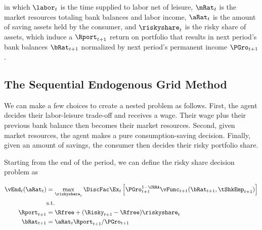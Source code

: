 \documentclass[\econtexRoot/EGMN]{subfiles}
\begin{document}
in which $\labor_{t}$ is the time supplied to labor net of leisure, $\mRat_{t}$ is the market resources totaling bank balances and labor income, $\aRat_{t}$ is the amount of saving assets held by the consumer, and $\riskyshare_{t}$ is the risky share of assets, which induce a $\Rport_{t+1}$ return on portfolio that results in next period's bank balances $\bRat_{t+1}$ normalized by next period's permanent income $\PGro_{t+1}$.


\subsection{The Sequential Endogenous Grid Method}

We can make a few choices to create a nested problem as follows. First, the
agent decides their labor-leisure trade-off and receives a wage. Their wage
plus their previous bank balance then becomes their market resources. Second, given
market resources, the agent makes a pure consumption-saving decision. Finally, given an amount of savings, the consumer then decides their risky portfolio share.

Starting from the end of the period, we can define the risky share decision problem as

\begin{equation}
    \begin{split}
        \vEnd_{t}(\aRat_{t}) & = \max_{\riskyshare_{t}} \DiscFac
        \Ex_{t} \left[ \PGro_{t+1}^{1-\CRRA}
            \vFunc_{t+1}(\bRat_{t+1},
            \tShkEmp_{t+1}) \right] \\
        & \text{s.t.} \\
        \Rport_{t+1} & = \Rfree + (\Risky_{t+1} - \Rfree)
        \riskyshare_{t} \\
        \bRat_{t+1} & = \aRat_{t} \Rport_{t+1} / \PGro_{t+1}
    \end{split}
\end{equation}
\end{document}
